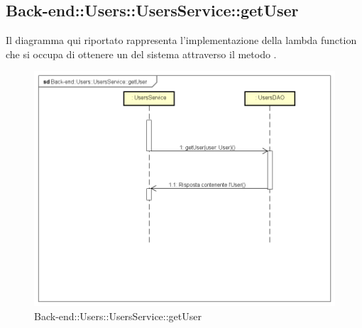 \subsection{Back-end::Users::UsersService::getUser}
Il diagramma qui riportato rappresenta l'implementazione della lambda function che si occupa di ottenere un  del sistema attraverso il metodo .  \begin{figure}[h] \centering \includegraphics[width=\textwidth,height=\textheight,keepaspectratio]{images/diagrams/back-end/Ufficial_Backend/Back-endUsersUsersServicegetUser.png} 	\caption{Back-end::Users::UsersService::getUser}
\end{figure}
\newpage

